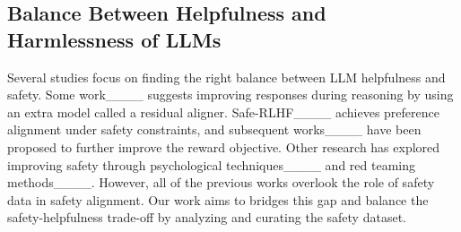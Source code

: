 \subsection{Balance Between Helpfulness and Harmlessness of LLMs} 
Several studies focus on finding the right balance between LLM helpfulness and safety. Some work____ suggests improving responses during reasoning by using an extra model called a residual aligner. Safe-RLHF____ achieves preference alignment under safety constraints, and subsequent works____ have been proposed to further improve the reward objective. Other research has explored improving safety through psychological techniques____ and red teaming methods____. However, all of the previous works overlook the role of safety data in safety alignment. Our work aims to bridges this gap and balance the safety-helpfulness trade-off by analyzing and curating the safety dataset.